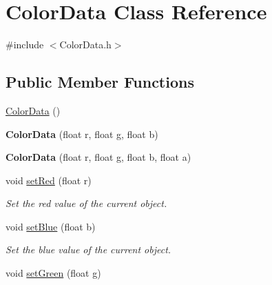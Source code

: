 \hypertarget{classColorData}{\section{Color\-Data Class Reference}
\label{classColorData}
}


{\ttfamily \#include $<$Color\-Data.\-h$>$}

\subsection*{Public Member Functions}
\begin{DoxyCompactItemize}
\item 
\hyperlink{classColorData_accf4e0c0d4549051a46783e964c95164}{Color\-Data} ()
\item 
\hypertarget{classColorData_a920b0332685ef72147fe19020fdac5d6}{{\bfseries Color\-Data} (float r, float g, float b)}\label{classColorData_a920b0332685ef72147fe19020fdac5d6}

\item 
\hypertarget{classColorData_a0ecce2c6c597d9379ebb329883298dfd}{{\bfseries Color\-Data} (float r, float g, float b, float a)}\label{classColorData_a0ecce2c6c597d9379ebb329883298dfd}

\item 
\hypertarget{classColorData_aa2e401956936f87a560b8f579514bf69}{void \hyperlink{classColorData_aa2e401956936f87a560b8f579514bf69}{set\-Red} (float r)}\label{classColorData_aa2e401956936f87a560b8f579514bf69}

\begin{DoxyCompactList}\small\item\em Set the red value of the current object. \end{DoxyCompactList}\item 
\hypertarget{classColorData_a01bbba90cac0bc1b3bd01d4aecc16477}{void \hyperlink{classColorData_a01bbba90cac0bc1b3bd01d4aecc16477}{set\-Blue} (float b)}\label{classColorData_a01bbba90cac0bc1b3bd01d4aecc16477}

\begin{DoxyCompactList}\small\item\em Set the blue value of the current object. \end{DoxyCompactList}\item 
\hypertarget{classColorData_a4a7833dfef4a33eee3857de09a72aee1}{void \hyperlink{classColorData_a4a7833dfef4a33eee3857de09a72aee1}{set\-Green} (float g)}\label{classColorData_a4a7833dfef4a33eee3857de09a72aee1}


\end{DoxyCompactItemize}
